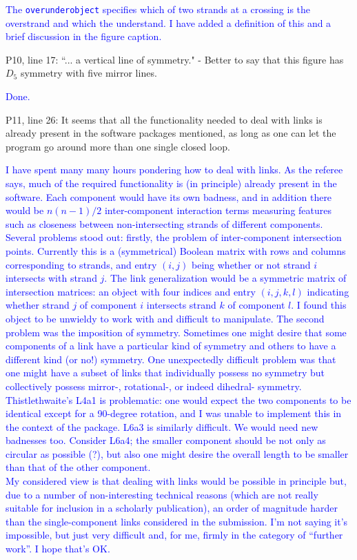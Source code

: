 \documentclass[12pt]{article}
\begin{document}
\textcolor{blue}{The {\tt overunderobject} specifies which of two
  strands at a crossing is the overstrand and which the understand.  I
  have added a definition of this and a brief discussion in the figure
  caption.}


P10, line 17: ``... a vertical line of symmetry." - Better to say that
this figure has $D_5$ symmetry with five mirror lines.


\textcolor{blue}{Done.}

P11, line 26: It seems that all the functionality needed to deal with
links is already present in the software packages mentioned, as long
as one can let the program go around more than one single closed loop.

\textcolor{blue}{I have spent many many hours pondering how to deal
  with links.  As the referee says, much of the required functionality
  is (in principle) already present in the software.  Each component
  would have its own badness, and in addition there would be
  $n(n-1)/2$ inter-component interaction terms measuring features such
  as closeness between non-intersecting strands of different
  components.  Several problems stood out: firstly, the problem of
  inter-component intersection points.  Currently this is a
  (symmetrical) Boolean matrix with rows and columns corresponding to
  strands, and entry $(i,j)$ being whether or not strand $i$
  intersects with strand $j$.  The link generalization would be a
  symmetric matrix of intersection matrices: an object with four
  indices and entry $(i,j,k,l)$ indicating whether strand $j$ of
  component $i$ intersects strand $k$ of component $l$.  I found this
  object to be unwieldy to work with and difficult to manipulate.  The
  second problem was the imposition of symmetry.  Sometimes one might
  desire that some components of a link have a particular kind of
  symmetry and others to have a different kind (or no!) symmetry.  One
  unexpectedly difficult problem was that one might have a subset of
  links that individually possess no symmetry but collectively possess
  mirror-, rotational-, or indeed dihedral- symmetry.
  Thistlethwaite's L4a1 is problematic: one would expect the two
  components to be identical except for a 90-degree rotation, and I
  was unable to implement this in the context of the package. L6a3 is
  similarly difficult.  We would need new badnesses too.  Consider
  L6a4; the smaller component should be not only as circular as
  possible (?), but also one might desire the overall length to be
  smaller than that of the other component.\\ My considered view is
  that dealing with links would be possible in principle but, due to a
  number of non-interesting technical reasons (which are not really
  suitable for inclusion in a scholarly publication), an order of
  magnitude harder than the single-component links considered in the
  submission.  I'm not saying it's impossible, but just very difficult
  and, for me, firmly in the category of ``further work''.  I hope
  that's OK.}
\end{document}
